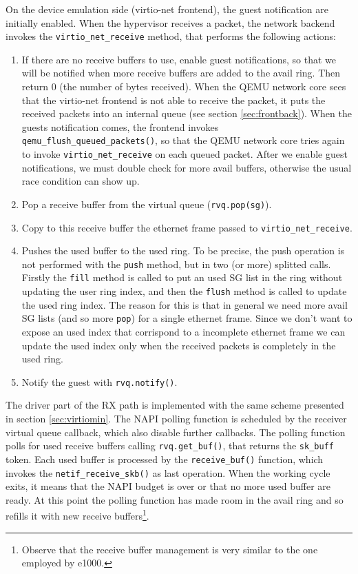 On the device emulation side (virtio-net frontend), the guest notification are initially enabled.
When the hypervisor receives a packet, the network backend invokes the \texttt{virtio\_net\_receive} method, that performs the
following actions:
\begin{enumerate}
  \item If there are no receive buffers to use, enable guest notifications, so that we will be notified when more receive buffers
	are added to the avail ring. Then return 0 (the number of bytes received). When the QEMU network core sees that the virtio-net
	frontend is not able to receive the packet, it puts the received packets into an internal queue (see section \ref{sec:frontback}). 
	When the guests notification comes, the frontend invokes \texttt{qemu\_flush\_queued\_packets()}, so that the QEMU network core 
	tries again to invoke \texttt{virtio\_net\_receive} on each queued packet.
	After we enable guest notifications, we must double check for more avail buffers, otherwise the usual race condition can show up.
	
  \item Pop a receive buffer from the virtual queue (\texttt{rvq.pop(sg)}).
  
  \item Copy to this receive buffer the ethernet frame passed to \texttt{virtio\_net\_receive}.
  
  \item Pushes the used buffer to the used ring. To be precise, the push operation is not performed with the \texttt{push} method, 
	but in two (or more) splitted calls. Firstly the \texttt{fill} method is called to put an used SG list in the ring without
	updating the user ring index, and then the \texttt{flush} method is called to update the used ring index. The reason for this
	is that in general we need more avail SG lists (and so more \texttt{pop}) for a single ethernet frame. Since we don't want to
	expose an used index that corrispond to a incomplete ethernet frame we can update the used index only when the received packets
	is completely in the used ring.
	
  \item Notify the guest with \texttt{rvq.notify()}.
\end{enumerate}

The driver part of the RX path is implemented with the same scheme presented in section \ref{sec:virtiomin}. The NAPI polling function is
scheduled by
the receiver virtual queue callback, which also disable further callbacks. The polling function polls for used receive buffers calling
\texttt{rvq.get\_buf()}, that returns the \texttt{sk\_buff} token. Each used buffer is processed by the \texttt{receive\_buf()} function,
which invokes the \texttt{netif\_receive\_skb()} as last operation.
When the working cycle exits, it means that the NAPI budget is over or that no more used buffer are ready.
At this point the polling function has made room in the avail ring and so refills it with new receive buffers\footnote{Observe that the
receive buffer management is very similar to the one employed by e1000.}.

